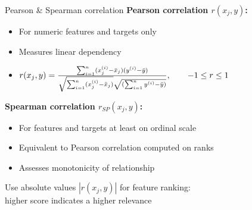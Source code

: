 \documentclass[11pt,compress,t,notes=noshow, xcolor=table]{beamer}
\begin{document}
  \begin{framev}{Pearson \& Spearman correlation}
  \textbf{Pearson correlation $r(x_j, y)$: }
  \begin{itemize}
    \item For numeric features and targets only
    \item Measures linear dependency
    \item $ r(x_j, y) = \frac{\sum_{i=1}^n (x^{(i)}_j - \bar{x}_j) (y^{(i)} - \bar{y})}{\sqrt{\sum_{i=1}^n (x^{(i)}_j - \bar{x}_j)} \sqrt{(\sum_{i=1}^n y^{(i)} - \bar{y})}},\qquad -1 \le r \le 1$
  \end{itemize}
  \vspace{0.4cm}
  \textbf{Spearman correlation $r_{SP}(x_j, y)$:}
  \begin{itemize}
    \item For features and targets at least on ordinal scale
    \item Equivalent to Pearson correlation computed on ranks
    \item Assesses monotonicity of relationship
  \end{itemize}
  \lz
  Use absolute values $|r(x_j, y)|$ for feature ranking:\\
  higher score indicates a higher relevance

  \end{framev}
\end{document}
